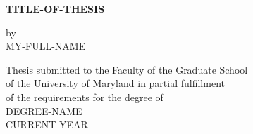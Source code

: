 \begin{titlepage}
\mbox{}\vspace{1in}
\begin{center}

    {\Large \bf TITLE-OF-THESIS \par}
    
\vspace{2in}

    {\large by} \\
    {\large MY-FULL-NAME}
    
\vspace{2in}

  \begin{singlespace}
    Thesis submitted to the Faculty of the Graduate School \\
    of the University of Maryland in partial fulfillment \\
    of the requirements for the degree of \\
    DEGREE-NAME \\
    CURRENT-YEAR
	\end{singlespace}
\end{center}
\end{titlepage}
